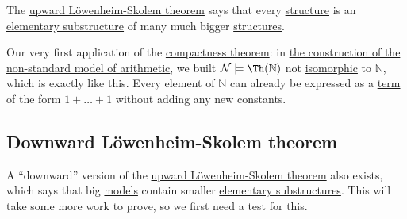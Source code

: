 \begin{intuition}
	The \hyperref[thm:upward-Lowenheim-Skolem]{upward Löwenheim-Skolem theorem} says that every \hyperref[def:structure]{structure} is an \hyperref[def:elementary-substructure]{elementary substructure} of many much bigger \hyperref[def:structure]{structures}.
\end{intuition}

\begin{prev}
	Our very first application of the \hyperref[thm:compactness]{compactness theorem}: in \hyperref[eg:construction-non-standard-model-of-arithmetic]{the construction of the non-standard model of arithmetic}, we built \(\mathcal{N} \models \Th(\mathbb{N} ) \) not \hyperref[def:isomorphism]{isomorphic} to \(\mathbb{N} \), which is exactly like this. Every element of \(\mathbb{N} \) can already be expressed as a \hyperref[def:term]{term} of the form \(1+\dots +1\) without adding any new constants.
\end{prev}

\subsection{Downward Löwenheim-Skolem theorem}
A ``downward'' version of the \hyperref[thm:upward-Lowenheim-Skolem]{upward Löwenheim-Skolem theorem} also exists, which says that big \hyperref[def:model]{models} contain smaller \hyperref[def:elementary-substructure]{elementary substructures}. This will take some more work to prove, so we first need a test for this.

